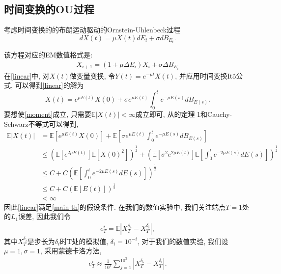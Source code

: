 \subsection{时间变换的OU过程}
\begin{example}
	考虑时间变换的的布朗运动驱动的Ornstein-Uhlenbeck过程
	\begin{equation}\label{linear}
		dX(t) = \mu X(t)dE_t + \sigma dB_{E_t}. 
	\end{equation}
\end{example}
该方程对应的EM数值格式是:
\begin{align*}
	X_{i+1} = (1 + \mu \Delta E_i) X_i + \sigma \Delta B_{E_i}
\end{align*}
在\cref{linear}中, 对$X(t)$做变量变换, 令$Y(t) = e^{-\mu t}X(t)$, 并应用时间变换It\^{o}公式, 可以得到\cref{linear}的解为
\begin{equation}\label{linear solusion}
	X(t) = e^{\mu E(t)}X(0) + \sigma e^{\mu E(t)} \int_{0}^{t}e^{-\mu E(s)}dB_{E(s)}. 
\end{equation}
要想使\cref{moment}成立, 只需要$\mathbb{E}|X(t)| < \infty$成立即可, 从\cite{jin2019strong}的定理 1和Cauchy-Schwarz不等式可以得到, 
\begin{align*}
	\mathbb{E}|X(t)| &= \mathbb{E}\left[e^{\mu E(t)}X(0)\right] + \mathbb{E}\left[\sigma e^{\mu E(t)}\int_0^t e^{-\mu E(s)}dB_{E(s)}\right]\\
	&\le \left(\mathbb{E}\left[e^{2\mu E(t)}\right]\mathbb{E}\left[X(0)^2\right]\right)^{\frac{1}{2}} + \left(\mathbb{E}\left[\sigma^2e^{2\mu E(t)}\right]\mathbb{E}\left[\int_0^te^{-2\mu E(s)}dE(s)\right]\right)^\frac{1}{2}\\
	& \le C + C\left(\mathbb{E}\left[\int_0^te^{-2\mu E(s)}dE(s)\right]\right)^{\frac{1}{2}}\\
	& \le C + C\left(\mathbb{E}[E(t)]\right)^{\frac{1}{2}}\\
	& < \infty
\end{align*}
因此\cref{linear}满足\cref{main th}的假设条件. 
在我们的数值实验中, 我们关注端点$T = 1$处的$L_1$误差, 因此我们令
\begin{align*}
	e_T^{i}=\mathbb{E}\left|X_T^{\delta _4}-X_T^{\delta _i}\right|, 
\end{align*}
其中$X_T^{\delta _i}$是步长为$\delta _i$时T处的模拟值, $\delta _i = 10^{-i}$, 对于我们的数值实验, 我们设$\mu=1, \sigma=1$, 采用蒙德卡洛方法, 
\begin{align*}
	e_{T}^i\approx\frac{1}{10^3}\sum_{j=1}^{10^3}\left|X_T^{\delta _5}-X_T^{\delta _i}\right|. 
\end{align*}
